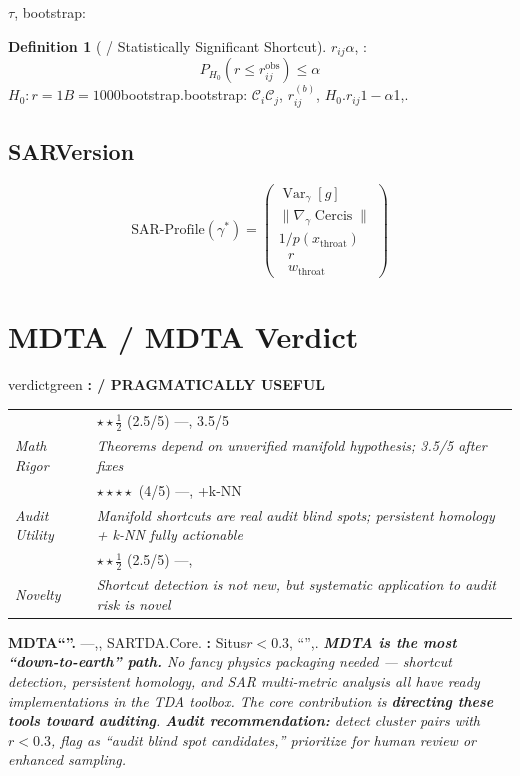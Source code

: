 \documentclass[11pt,a4paper]{article}
\theoremstyle{plain}
\theoremstyle{definition}
\newtheorem{definition}[theorem]{Definition}
\theoremstyle{remark}
\newcommand{\cC}{\mathcal{C}}
\DeclareMathOperator{\Cercis}{Cercis}
\DeclareMathOperator{\Var}{Var}
\begin{document}
{\subsection{}
$\tau$, bootstrap: 
\begin{definition}[ / Statistically Significant Shortcut]
\label{def:significant-shortcut}
$r_{ij}$$\alpha$, : 
\begin{equation}
 P_{H_0}(r \leq r_{ij}^{\text{obs}}) \leq \alpha
\end{equation}
$H_0: r = 1$$B = 1000$bootstrap.bootstrap: $\cC_i$$\cC_j$, $r_{ij}^{(b)}$, $H_0$.$r_{ij}$$1-\alpha$1,.
\end{definition}
\subsection{SARVersion}
\begin{equation}
 \text{SAR-Profile}(\gamma^*) = \begin{pmatrix}
 \Var_\gamma[g] \\
 \|\nabla_\gamma \Cercis\| \\
 1/p(x_{\text{throat}}) \\
 \text{ } r \\
 \text{ } w_{\text{throat}}
 \end{pmatrix}
\end{equation}
\section{MDTA / MDTA Verdict}
\label{sec:mdta-verdict}
\begin{verdictbox}{verdictgreen}
\textbf{: / PRAGMATICALLY USEFUL}
\medskip
\begin{tabular}{p{3cm} p{11cm}}
 & $\star\star\frac{1}{2}$ (2.5/5) ---, 3.5/5 \\
\textit{Math Rigor} & \textit{Theorems depend on unverified manifold hypothesis; 3.5/5 after fixes} \\
 & $\star\star\star\star$ (4/5) ---, +k-NN \\
\textit{Audit Utility} & \textit{Manifold shortcuts are real audit blind spots; persistent homology + k-NN fully actionable} \\
 & $\star\star\frac{1}{2}$ (2.5/5) ---, \\
\textit{Novelty} & \textit{Shortcut detection is not new, but systematic application to audit risk is novel} \\
\end{tabular}
\medskip
\textbf{MDTA``''.} ---,, SARTDA.Core.
\textbf{: } Situs$r < 0.3$, ``'',.
\textit{\textbf{MDTA is the most ``down-to-earth'' path.} No fancy physics packaging needed --- shortcut detection, persistent homology, and SAR multi-metric analysis all have ready implementations in the TDA toolbox. The core contribution is \textbf{directing these tools toward auditing}. \textbf{Audit recommendation:} detect cluster pairs with $r < 0.3$, flag as ``audit blind spot candidates,'' prioritize for human review or enhanced sampling.}
\end{verdictbox}
\newpage
}
\end{document}
